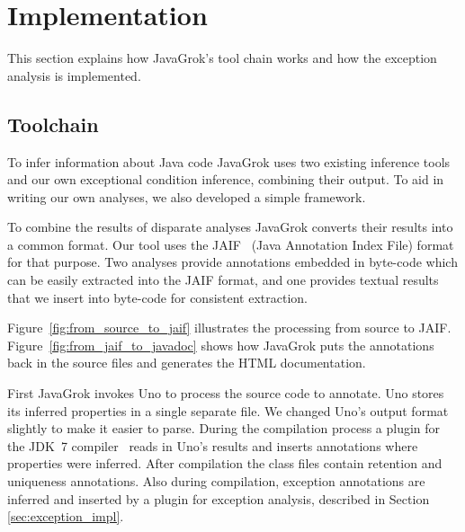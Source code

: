 \section{Implementation}
This section explains how JavaGrok's tool chain works and
how the exception analysis is implemented.

\subsection{Toolchain}

\begin{figure*}
\centering
{}
\caption{JavaGrok's toolchain from source to JAIF}
\label{fig:from_source_to_jaif}
\end{figure*}

To infer information about Java code JavaGrok uses two existing inference tools and 
our own exceptional condition inference, combining their output. 
To aid in writing our own analyses, we also developed a simple 
framework. 

To combine the results of disparate analyses JavaGrok converts their results
into a common format.  Our tool uses the JAIF~\cite{JAIF}
(Java Annotation Index File) format for that purpose. Two analyses provide 
annotations embedded in byte-code which can be easily extracted into the JAIF 
format, and one provides textual results that we insert into byte-code for
consistent extraction.

Figure~\ref{fig:from_source_to_jaif} 
illustrates the processing from source to JAIF. Figure~\ref{fig:from_jaif_to_javadoc} shows how JavaGrok
puts the annotations back in the source files and generates the HTML
documentation.

\begin{figure*}
\centering
{}
\caption{JavaGrok's toolchain from JAIF to Javadoc}
\label{fig:from_jaif_to_javadoc}
\end{figure*}

First JavaGrok invokes Uno to process the source code to annotate. 
Uno stores its inferred properties in a single separate file. We changed Uno's 
output format slightly to make it easier to parse.
During the compilation process a plugin for the JDK~7 compiler~\cite{jdk7} reads in Uno's results 
and inserts annotations where properties were inferred. 
After compilation the class files contain retention and uniqueness
annotations.
Also during compilation, exception annotations are inferred and inserted by a
plugin for exception analysis, described in Section \ref{sec:exception_impl}. 

